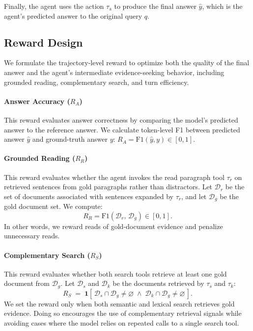 \documentclass[11pt]{article}
\begin{document}
Finally, the agent uses the action $\tau_{\mathrm{a}}$ to produce the final answer $\hat{y}$, which is the agent's predicted answer to the original query $q$.


\subsection{Reward Design}
\label{sec:reward}
We formulate the trajectory-level reward to optimize both the quality of the final answer and the agent's intermediate evidence-seeking behavior, including grounded reading, complementary search, and turn efficiency.

\paragraph{Answer Accuracy ($R_A$)} This reward evaluates answer correctness by comparing the model's predicted answer to the reference answer. We calculate token-level F1 between predicted answer $\hat{y}$ and ground-truth answer $y$: $R_A=\mathrm{F1}(\hat{y},y)\in[0,1]$.

\paragraph{Grounded Reading ($R_R$)}
This reward evaluates whether the agent invokes the read paragraph tool $\tau_r$ on retrieved sentences from gold paragraphs rather than distractors. Let $\mathcal{D}_r$ be the set of documents associated with sentences expanded by $\tau_r$, and let $\mathcal{D}_g$ be the gold document set. We compute:
\[
R_R=\mathrm{F1}(\mathcal{D}_r,\,\mathcal{D}_g)\in[0,1].
\]
In other words, we reward reads of gold-document evidence and penalize unnecessary reads.

\paragraph{Complementary Search ($R_S$)} This reward evaluates whether both search tools retrieve at least one gold document from $\mathcal{D}_g$. Let $\mathcal{D}_s$ and $\mathcal{D}_k$ be the documents retrieved by $\tau_s$ and $\tau_k$:
\[
R_S\;=\;\mathbf{1}\!\left[\,\mathcal{D}_s\cap\mathcal{D}_g\neq\varnothing \;\wedge\; \mathcal{D}_k\cap\mathcal{D}_g\neq\varnothing\,\right].
\]
We set the reward only when both semantic and lexical search retrieves gold evidence. Doing so encourages the use of complementary retrieval signals while avoiding cases where the model relies on repeated calls to a single search tool.
\end{document}
